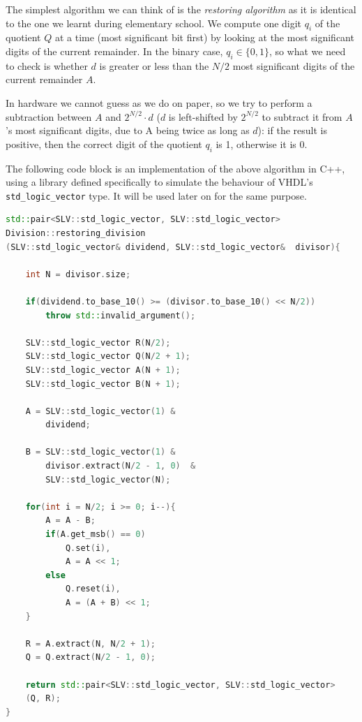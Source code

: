 The simplest algorithm we can think of is the \textit{restoring algorithm} as it is identical to the one we learnt during elementary school.
We compute one digit $q_i$ of the quotient $Q$ at a time (most significant bit first) by looking at the most significant digits of the current remainder.
In the binary case, $q_i \in \{0, 1\}$, so what we need to check is whether $d$ is greater or less than the $N/2$ most significant digits of the current remainder $A$. 
    
In hardware we cannot guess as we do on paper, so we try to perform a subtraction between $A$ and $2^{N/2}\cdot d$ ($d$ is left-shifted by $2^{N/2}$ to subtract it from $A$'s most significant digits, due to A being twice as long as $d$): if the result is positive, then the correct digit of the quotient $q_i$ is 1, otherwise it is 0.

The following code block is an implementation of the above algorithm in C++, using a library defined specifically to simulate the behaviour of VHDL's \texttt{std\_logic\_vector} type.
It will be used later on for the same purpose.


\begin{lstlisting}[language=C++]
std::pair<SLV::std_logic_vector, SLV::std_logic_vector> 
Division::restoring_division
(SLV::std_logic_vector& dividend, SLV::std_logic_vector&  divisor){
 
    int N = divisor.size;

    if(dividend.to_base_10() >= (divisor.to_base_10() << N/2))
        throw std::invalid_argument();    

    SLV::std_logic_vector R(N/2);
    SLV::std_logic_vector Q(N/2 + 1);
    SLV::std_logic_vector A(N + 1);
    SLV::std_logic_vector B(N + 1);

    A = SLV::std_logic_vector(1) & 
        dividend;

    B = SLV::std_logic_vector(1) & 
        divisor.extract(N/2 - 1, 0)  & 
        SLV::std_logic_vector(N);

    for(int i = N/2; i >= 0; i--){         
        A = A - B;
        if(A.get_msb() == 0)
            Q.set(i),
            A = A << 1;
        else
            Q.reset(i),
            A = (A + B) << 1;
    }

    R = A.extract(N, N/2 + 1);
    Q = Q.extract(N/2 - 1, 0);

    return std::pair<SLV::std_logic_vector, SLV::std_logic_vector>
    (Q, R);
}
\end{lstlisting}


